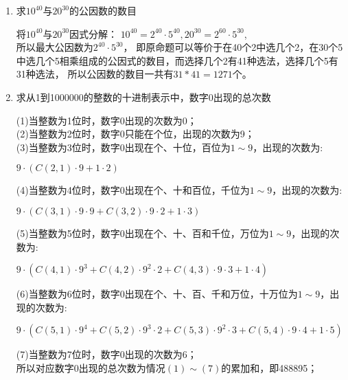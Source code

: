 \documentclass[a4paper]{article}
\begin{document}
\begin{enumerate}
\item 求$10^{40}$与$20^{30}$的公因数的数目
\begin{solution}
      \begin{enumerate}
      将$10^{40}$与$20^{30}$因式分解：
      $10^{40}=2^{40}\cdot 5^{40},20^{30}=2^{60}\cdot 5^{30}$,
      \\所以最大公因数为$2^{40}\cdot 5^{30}$，
      即原命题可以等价于在40个2中选几个2，在30个5中选几个5相乘组成的公因式的数目，而选择几个2有41种选法，选择几个5有31种选法，
      所以公因数的数目一共有$31*41=1271$个。
     \end{enumerate}
\end{solution}

\item 求从1到1000000的整数的十进制表示中，数字0出现的总次数
\begin{solution}
      \begin{enumerate}
      (1)当整数为1位时，数字0出现的次数为0；\\
      (2)当整数为2位时，数字0只能在个位，出现的次数为9；\\
      (3)当整数为3位时，数字0出现在个、十位，百位为$1\sim9$，出现的次数为:\\
      \begin{center}
            $9\cdot (C(2,1)\cdot 9+1\cdot 2)$\\
      \end{center}
      (4)当整数为4位时，数字0出现在个、十和百位，千位为$1\sim9$，出现的次数为:\\
      \begin{center}
             $9\cdot (C(3,1)\cdot 9\cdot 9+C(3,2)\cdot 9\cdot 2+1\cdot 3)$\\
      \end{center}
      (5)当整数为5位时，数字0出现在个、十、百和千位，万位为$1\sim9$，出现的次数为:\\
      \begin{center}
            $9\cdot (C(4,1)\cdot 9^3+C(4,2)\cdot 9^2\cdot 2+C(4,3)\cdot 9\cdot 3+1\cdot 4)$\\
      \end{center}
      (6)当整数为6位时，数字0出现在个、十、百、千和万位，十万位为$1\sim9$，出现的次数为:\\
      \begin{center}
            $9\cdot (C(5,1)\cdot 9^4+C(5,2)\cdot 9^3\cdot 2+C(5,3)\cdot 9^2\cdot 3+C(5,4)\cdot 9\cdot 4+1\cdot 5)$\\
      \end{center}
      (7)当整数为7位时，数字0出现的次数为6；\\   
      所以对应数字0出现的总次数为情况$(1)\sim(7)$的累加和，即488895；  
\end{enumerate}
\end{solution}


\end{enumerate}
\end{document}
